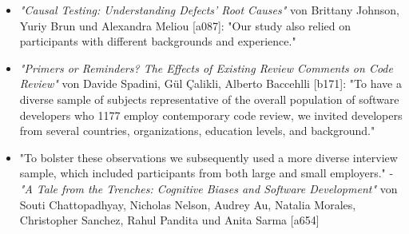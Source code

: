 \begin{itemize}
    \item \textit{"Causal Testing: Understanding Defects’ Root Causes"} von Brittany Johnson, Yuriy Brun und Alexandra Meliou [a087]: "Our study also relied on participants with different backgrounds and experience."
    \item \textit{"Primers or Reminders? The Effects of Existing Review Comments on Code Review"} von Davide Spadini, Gül Çalikli, Alberto Baccehlli [b171]: "To have a diverse sample of subjects representative of the overall population of software developers who 1177 employ contemporary code review, we invited developers from several countries, organizations, education levels, and background."
    \item "To bolster these observations we subsequently used a more diverse interview sample, which included participants from both large and small employers." - \textit{"A Tale from the Trenches: Cognitive Biases and Software Development"} von Souti Chattopadhyay, Nicholas Nelson, Audrey Au, Natalia Morales, Christopher Sanchez, Rahul Pandita und Anita Sarma [a654]
\end{itemize}
